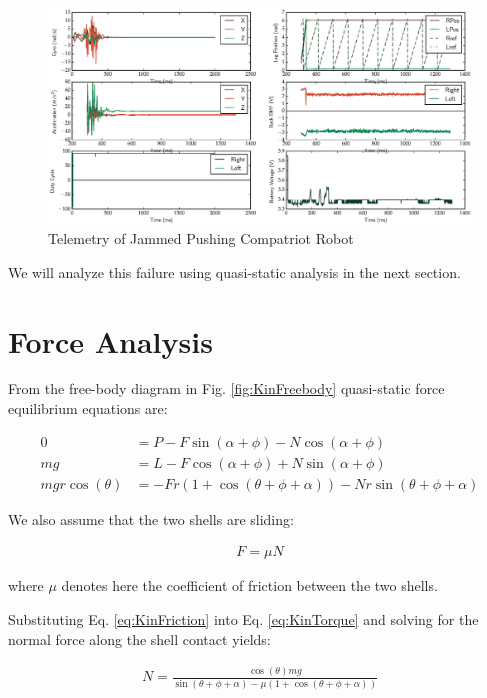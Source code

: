 \documentclass[letterpaper]{report}
\begin{document}
\begin{figure}[ht]
  \centering
  \includegraphics[width=\textwidth]{JammedTelemetry.eps}
  \caption{\label{fig:JammedKinFlipTelemetry}Telemetry of Jammed Pushing Compatriot Robot}
\end{figure}

We will analyze this failure using quasi-static analysis in the next section.

\section{Force Analysis \label{sec:KinForces}}
From the free-body diagram in Fig. \ref{fig:KinFreebody} quasi-static force equilibrium equations are:

\begin{align}
   0 &= P - F \sin(\alpha + \phi) - N \cos(\alpha + \phi) \label{eq:KinQSX} \\
  mg &= L - F \cos(\alpha + \phi) + N \sin(\alpha + \phi) \label{eq:KinQSY} \\
  mg r \cos(\theta) &= -F r (1 + \cos(\theta + \phi + \alpha) ) - N r \sin(\theta + \phi + \alpha) \label{eq:KinTorque}
\end{align}

We also assume that the two shells are sliding:

\begin{align}
  F = \mu N
  \label{eq:KinFriction}
\end{align}

where $\mu$ denotes here the coefficient of friction between the two shells.

Substituting Eq. \ref{eq:KinFriction} into Eq. \ref{eq:KinTorque} and solving for the normal force along the shell contact yields:

\begin{align}
N = \frac{\cos(\theta) m g}{\sin(\theta + \phi + \alpha) - \mu (1+\cos(\theta + \phi + \alpha)) }
\end{align}
\end{document}
